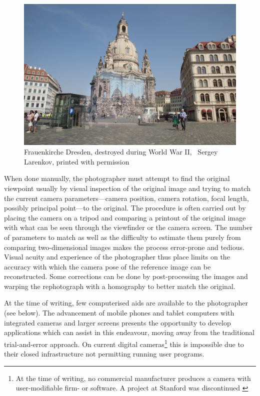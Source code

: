 \begin{figure}
   \includegraphics[width=\textwidth]{gfx/1950_2014_Frauenkirche_small.jpg}
   \caption[Frauenkirche Dresden]{Frauenkirche Dresden, destroyed during World War II,
   \textcopyright\ Sergey Larenkov, printed with permission}
   \label{fig2}
\end{figure}

When done manually, the photographer must attempt to find the original viewpoint 
usually by visual inspection of the original image and trying to match the
current camera parameters---camera position, camera rotation, focal length,
possibly principal point---to the original.
The procedure is often carried out by placing the camera on a tripod and
comparing a printout of the original image with what can be seen through the
viewfinder or the camera screen. The number of parameters to match as well as
the difficulty to estimate them purely from comparing two-dimensional images makes the process
error-prone and tedious. Visual acuity and experience of the photographer thus
place limits on the accuracy with which the camera pose of the reference image
can be reconstructed. Some corrections can be done by post-processing the images
and warping the rephotograph with a homography to better match the original.

At the time of writing, few computerised aids are available to the photographer
(see below).  The advancement of mobile phones and tablet computers with
integrated cameras and larger screens presents the opportunity to develop
applications which can assist in this endeavour, moving away from the
traditional trial-and-error approach.  On current digital cameras\footnote{At
   the time of writing, no commercial manufacturer produces a camera with
   user-modifiable firm- or software. A project at Stanford \citep{Levoy2010}
was discontinued \cite{FrankenCam}} this is impossible due to their closed
infrastructure not permitting running user programs. 

